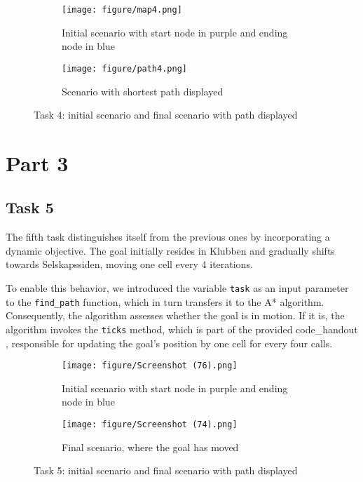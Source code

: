 \documentclass{article}
\begin{document}
\begin{figure}[H]
\centering
\begin{subfigure}[b]{0.4 \textwidth}
    \texttt{[image: figure/map4.png]}
    \caption{Initial scenario with start node in purple and ending node in blue}
    \label{fig:map4}
\end{subfigure}
\hfill
\begin{subfigure}{0.4\textwidth}
    \texttt{[image: figure/path4.png]}
    \caption{Scenario with shortest path displayed}
    \label{fig:path4}
\end{subfigure}
\caption{Task 4: initial scenario and final scenario with path displayed}
\label{fig:task4}
\end{figure}

\section{Part 3}

\subsection{Task 5}
The fifth task distinguishes itself from the previous ones by incorporating a dynamic objective. The goal initially resides in Klubben and gradually shifts towards Selskapssiden, moving one cell every 4 iterations.

To enable this behavior, we introduced the variable \texttt{task} as an input parameter to the \texttt{find\_path} function, which in turn transfers it to the A* algorithm. Consequently, the algorithm assesses whether the goal is in motion. If it is, the algorithm invokes the \texttt{ticks} method, which is part of the provided code\_handout \cite{code}, responsible for updating the goal's position by one cell for every four calls.

\begin{figure}[H]
\centering
\begin{subfigure}[b]{0.4 \textwidth}
    \texttt{[image: figure/Screenshot (76).png]}
    \caption{Initial scenario with start node in purple and ending node in blue}
    \label{fig:map5}
\end{subfigure}
\hfill
\begin{subfigure}{0.4\textwidth}
    \texttt{[image: figure/Screenshot (74).png]}
    \caption{Final scenario, where the goal has moved}
    \label{fig:path5}
\end{subfigure}
\caption{Task 5: initial scenario and final scenario with path displayed}
\label{fig:task4}
\end{figure}

\newpage


\end{document}
